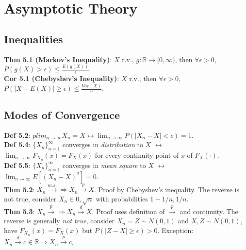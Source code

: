 \section{Asymptotic Theory}
\subsection{Inequalities}
\textbf{Thm 5.1 (Markov's Inequality)}: $X$ r.v., $g: \mathbb{R} \to [0, \infty)$, then $\forall \epsilon > 0$, $P(g(X) > \epsilon) \leq \frac{E(g(X))}{\epsilon}$.\\
\textbf{Cor 5.1 (Chebyshev's Inequality)}: $X$ r.v., then $\forall \epsilon > 0$, $P(|X-E(X)| \geq \epsilon) \leq \frac{Var(X)}{\epsilon^2}$.

\subsection{Modes of Convergence}
\textbf{Def 5.2}: $plim_{n\to\infty}X_n = X \leftrightarrow \lim_{n\to\infty}P(|X_n-X|<\epsilon) = 1$.\\
\textbf{Def 5.4}: $\{X_n\}_{n=1}^\infty$ converges in \emph{distribution} to $X$ $\leftrightarrow$ $\lim_{n\to\infty}F_{X_n}(x) = F_X(x)$ for every continuity point of $x$ of $F_X(\cdot)$. \\
\textbf{Def 5.5}: $\{X_n\}_{n=1}^\infty$ converges in \emph{mean square} to $X$ $\leftrightarrow$ $\lim_{n\to\infty}E[(X_n-X)^2] = 0$. \\
\textbf{Thm 5.2}: $X_n \xrightarrow{m.s.} \Rightarrow X_n \xrightarrow{p}X$. Proof by Chebyshev's inequality. The reverse is not true, consider $X_n \in{0, \sqrt{n}}$ with probabilities $1-1/n, 1/n$.\\
\textbf{Thm 5.3}: $X_n \xrightarrow{p} \Rightarrow X_n \xrightarrow{d}X$. Proof uses definition of $\xrightarrow{p}$ and continuity. The reverse is generally \emph{not true}, consider $X_n = Z \sim N(0,1)$ and $X, Z \sim N(0, 1)$, have $F_{X_n}(x) = F_X(x)$ but $P(|Z-X|\geq\epsilon) > 0$. Exception: $X_n \xrightarrow{d} c \in \mathbb{R} \Rightarrow X_n \xrightarrow{p} c$.

